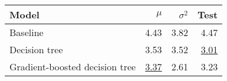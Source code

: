 \begin{tabular}{lrrr}
  \toprule
  Model                          & $\mu$            & $\sigma^2$ & Test
  \\
  \midrule
  Baseline                       & 4.43             & 3.82       & 4.47
  \\
  Decision tree                  & 3.53             & 3.52       & \underline{3.01}
  \\
  Gradient-boosted decision tree & \underline{3.37} & 2.61       & 3.23
  \\
  \bottomrule
\end{tabular}
